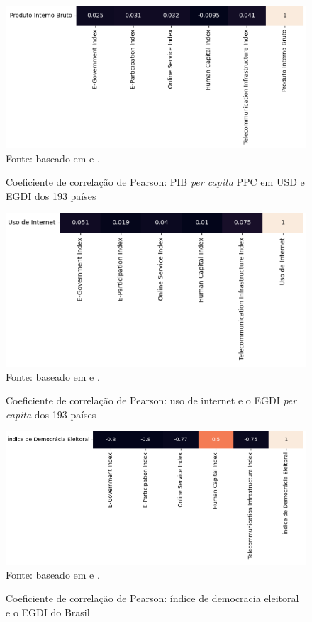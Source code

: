 \begin{figure}[H]
    \centering
    \caption{Coeficiente de correlação de Pearson: PIB \textit{per capita} PPC em USD e EGDI dos 193 países}
    \includegraphics[width=1\linewidth]{figuras/egdi/correlacao4.png}
    \label{fig:correlacao4}
    \footnotesize{Fonte: baseado em \cite{ONU_edgi_mapa} e \cite{WB_pib_per_capita_paises}.}
\end{figure}

\begin{figure}[H]
    \centering
    \caption{Coeficiente de correlação de Pearson: uso de internet e o EGDI \textit{per capita} dos 193 países}
    \includegraphics[width=1\linewidth]{figuras/egdi/correlacao5.png}
    \label{fig:correlacao5}
    \footnotesize{Fonte: baseado em \cite{ONU_edgi_mapa} e \cite{ITU_uso_internet_mundo}.}
\end{figure}


\begin{figure}[H]
    \centering
    \caption{Coeficiente de correlação de Pearson: índice de democracia eleitoral e o EGDI do Brasil}
    \includegraphics[width=1\linewidth]{figuras/egdi/correlacao8.png}
    \label{fig:orrelacao8}
    \footnotesize{Fonte: baseado em \cite{ONU_edgi_mapa} e \cite{electoral_democracy_index}.}
\end{figure}

